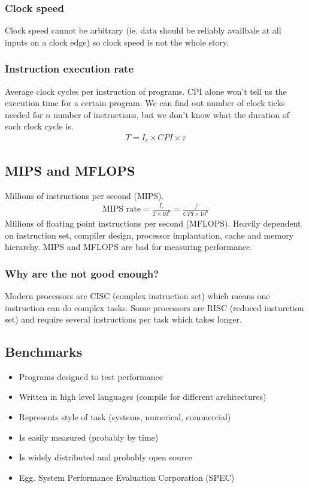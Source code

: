 \subsubsection{Clock speed}\label{ssub:clock_speed_one}

Clock speed cannot be arbitrary (ie. data should be reliably availbale at all inputs on a clock edge) so clock speed is not the whole story.

\subsubsection{Instruction execution rate}\label{ssub:instruction_execution_rate}

Average clock cycles per instruction of programs.
CPI alone won't tell us the execution time for a certain program.
We can find out number of clock ticks needed for \(n\) number of instructions, but we don't know what the duration of each clock cycle is.
\begin{align*}
	T = I_c \times CPI \times \tau
\end{align*}

\subsection{MIPS and MFLOPS}\label{sub:mips_and_mflops}

Millions of instructions per second (MIPS).
\begin{align*}
	\textrm{MIPS rate} = \frac{I_c}{T \times 10^6} = \frac{f}{CPI \times 10^6}
\end{align*}
Millions of floating point instructions per second (MFLOPS).
Heavily dependent on instruction set, compiler design, processor implantation, cache and memory hierarchy.
MIPS and MFLOPS are bad for measuring performance.

\subsubsection{Why are the not good enough?}\label{ssub:why_are_the_not_good_enough_}

Modern processors are CISC (complex instruction set) which means one instruction can do complex tasks.
Some processors are RISC (reduced insturction set) and require several instructions per task which takes longer.

\subsection{Benchmarks}\label{sub:benchmarks}

\begin{itemize}
	\item Programs designed to test performance
	\item Written in high level languages (compile for different architectures)
	\item Represents style of task (systems, numerical, commercial)
	\item Is easily measured (probably by time)
	\item Is widely distributed and probably open source
	\item Egg. System Performance Evaluation Corporation (SPEC)
\end{itemize}
